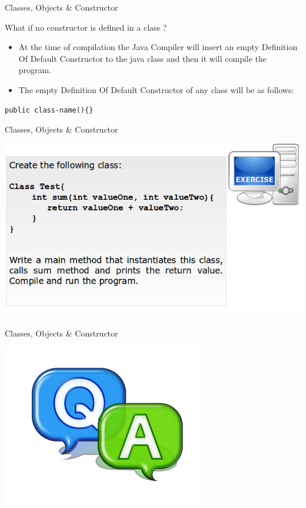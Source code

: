 \documentclass[14pt]{beamer}
\begin{document}
\begin{frame}[fragile]{Classes, Objects \& Constructor}
\begin{block}{}
What if no constructor is defined  in a class ?
\end{block}
\begin{itemize}
\item  At the time of compilation the Java Compiler will insert an empty Definition Of Default Constructor to the java class and then it will compile the program.
\item The empty Definition Of Default Constructor of any class will be as follows:
\end{itemize}
\begin{lstlisting}[numbers=none]
public class-name(){} 
\end{lstlisting}
\end{frame}
\begin{frame}{Classes, Objects \& Constructor}
\begin{center}
\includegraphics[scale=0.5]{COJ-M01-S03-Image26.png}
\end{center}
\end{frame}
\begin{frame}{Classes, Objects \& Constructor}
\begin{center}
\includegraphics[scale=0.5]{COJ-M01-S03-Image27.png}
\end{center}
\end{frame}
\end{document}
